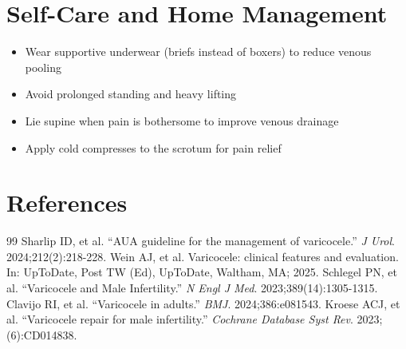 \section*{Self-Care and Home Management}
\begin{itemize}
  \item Wear supportive underwear (briefs instead of boxers) to reduce venous pooling
  \item Avoid prolonged standing and heavy lifting
  \item Lie supine when pain is bothersome to improve venous drainage
  \item Apply cold compresses to the scrotum for pain relief
\end{itemize}

\section*{References}
\begin{thebibliography}{99}
 Sharlip ID, et al. ``AUA guideline for the management of varicocele.'' \emph{J Urol}. 2024;212(2):218-228.
 Wein AJ, et al. Varicocele: clinical features and evaluation. In: UpToDate, Post TW (Ed), UpToDate, Waltham, MA; 2025.
 Schlegel PN, et al. ``Varicocele and Male Infertility.'' \emph{N Engl J Med}. 2023;389(14):1305-1315.
 Clavijo RI, et al. ``Varicocele in adults.'' \emph{BMJ}. 2024;386:e081543.
 Kroese ACJ, et al. ``Varicocele repair for male infertility.'' \emph{Cochrane Database Syst Rev}. 2023;(6):CD014838.
\end{thebibliography}
